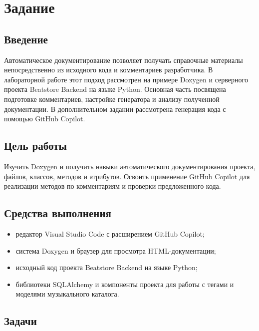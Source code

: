 \section{Задание}

\subsection{Введение}

Автоматическое документирование позволяет получать справочные материалы
непосредственно из исходного кода и комментариев разработчика. В лабораторной
работе этот подход рассмотрен на примере Doxygen и серверного проекта
Beatstore Backend на языке Python. Основная часть посвящена подготовке
комментариев, настройке генератора и анализу полученной документации.
В дополнительном задании рассмотрена генерация кода с помощью GitHub Copilot.

\subsection{Цель работы}

Изучить Doxygen и получить навыки автоматического документирования
проекта, файлов, классов, методов и атрибутов. Освоить применение
GitHub Copilot для реализации методов по комментариям и проверки
предложенного кода.

\subsection{Средства выполнения}

\begin{itemize}
	\item редактор Visual Studio Code с расширением GitHub Copilot;
	\item система Doxygen и браузер для просмотра HTML-документации;
	\item исходный код проекта Beatstore Backend на языке Python;
	\item библиотеки SQLAlchemy и компоненты проекта для работы с тегами
	и моделями музыкального каталога.
\end{itemize}

\subsection{Задачи}

